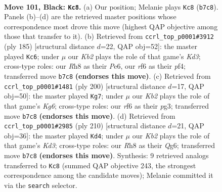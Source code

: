 \documentclass[11pt]{article}
\begin{document}
\clearpage

\begin{figure}[p]\centering
\begin{subfigure}{0.46\textwidth}\centering
\resizebox{\linewidth}{!}{%
\newchessgame
\chessboard[
  setfen={7r/1k3R2/5R2/8/8/5K2/8/8 b - - 0 101},
  showmover=false,
  pgfstyle=straightmove, color=movearrow, markmove={b7-c8}
]}
\caption{}
\end{subfigure}\hfill
\begin{subfigure}{0.46\textwidth}\centering
\resizebox{\linewidth}{!}{%
\newchessgame
\chessboard[
  setfen={8/8/3kp3/8/5P2/3R4/3K4/1r6 b - - 14 93},
  showmover=false,
  pgfstyle=straightmove, color=movearrow, markmove={d6-c6}
]}
\caption{}
\end{subfigure}
\\[4pt]
\begin{subfigure}{0.46\textwidth}\centering
\resizebox{\linewidth}{!}{%
\newchessgame
\chessboard[
  setfen={8/8/2kr2K1/8/7P/6p1/8/4R3 w - - 8 101},
  showmover=false,
  pgfstyle=straightmove, color=movearrow, markmove={g6-g7}
]}
\caption{}
\end{subfigure}\hfill
\begin{subfigure}{0.46\textwidth}\centering
\resizebox{\linewidth}{!}{%
\newchessgame
\chessboard[
  setfen={8/3k4/6Q1/8/8/1r1K2P1/1r6/8 w - - 15 106},
  showmover=false,
  pgfstyle=straightmove, color=movearrow, markmove={d3-d4}
]}
\caption{}
\end{subfigure}
\caption{\textbf{Move 101, Black: \texttt{Kc8}.} (a) Our position; Melanie plays \texttt{Kc8} (\texttt{b7c8}). Panels (b)--(d) are the retrieved master positions whose correspondence most drove this move (highest QAP objective among those that transfer to it). (b) Retrieved from \texttt{ccrl\_top\_p0001\#3912} (ply 185) [structural distance $d$=22, QAP obj=52]: the master played \texttt{Kc6}; under $\mu$ our \emph{Kb2} plays the role of that game's \emph{Kd3}; cross-type roles: our \emph{R}h8 as their \emph{P}e6, our \emph{r}f6 as their \emph{p}f4; transferred move \texttt{b7c8} \textbf{(endorses this move)}. (c) Retrieved from \texttt{ccrl\_top\_p0001\#1481} (ply 200) [structural distance $d$=17, QAP obj=50]: the master played \texttt{Kg7}; under $\mu$ our \emph{Kb2} plays the role of that game's \emph{Kg6}; cross-type roles: our \emph{r}f6 as their \emph{p}g3; transferred move \texttt{b7c8} \textbf{(endorses this move)}. (d) Retrieved from \texttt{ccrl\_top\_p0001\#2985} (ply 210) [structural distance $d$=21, QAP obj=36]: the master played \texttt{Kd4}; under $\mu$ our \emph{Kb2} plays the role of that game's \emph{Kd3}; cross-type roles: our \emph{R}h8 as their \emph{Q}g6; transferred move \texttt{b7c8} \textbf{(endorses this move)}. Synthesis: 9 retrieved analogs transferred to \texttt{Kc8} (summed QAP objective 243, the strongest correspondence among the candidate moves); Melanie committed it via the \texttt{search} selector.}
\label{fig:thought-m201}
\end{figure}
\end{document}
